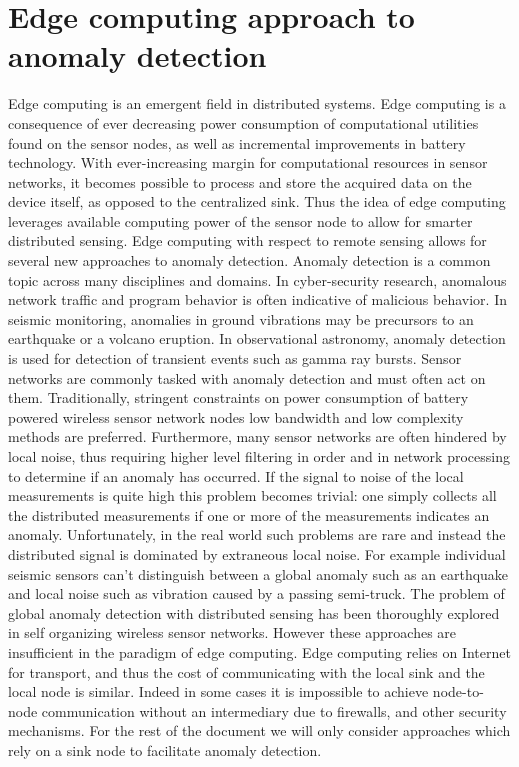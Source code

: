 \section{Edge computing approach to anomaly detection}\label{intro:edge}
Edge computing is an emergent field in distributed systems. Edge computing is a consequence of ever decreasing power consumption of computational utilities found on the sensor nodes, as well as incremental improvements in battery technology. With ever-increasing margin for computational resources in sensor networks, it becomes possible to process and store the acquired data on the device itself, as opposed to the centralized sink. Thus the idea of edge computing leverages available computing power of the sensor node to allow for smarter distributed sensing. Edge computing with respect to remote sensing allows for several new approaches to anomaly detection. Anomaly detection is a common topic across many disciplines and domains. In cyber-security research, anomalous network traffic and program behavior is often indicative of malicious behavior. In seismic monitoring, anomalies in ground vibrations may be precursors to an earthquake or a volcano eruption. In observational astronomy, anomaly detection is used for detection of transient events such as gamma ray bursts. Sensor networks are commonly tasked with anomaly detection and must often act on them. Traditionally, stringent constraints on power consumption of battery powered wireless sensor network nodes low bandwidth and low complexity methods are preferred. Furthermore, many sensor networks are often hindered by local noise, thus requiring higher level filtering in order and in network processing to determine if an anomaly has occurred. If the signal to noise of the local measurements is quite high this problem becomes trivial: one simply collects all the distributed measurements if one or more of the measurements indicates an anomaly. Unfortunately, in the real world such problems are rare and instead the distributed signal is dominated by extraneous local noise. For example individual seismic sensors can’t distinguish between a global anomaly such as an earthquake and local noise such as vibration caused by a passing semi-truck. The problem of global anomaly detection with distributed sensing has been thoroughly explored in self organizing wireless sensor networks. However these approaches are insufficient in the paradigm of edge computing. Edge computing relies on Internet for transport, and thus the cost of communicating with the local sink and the local node is similar. Indeed in some cases it is impossible to achieve node-to-node communication without an intermediary due to firewalls, and other security mechanisms. For the rest of the document we will only consider approaches which rely on a sink node to facilitate anomaly detection.

